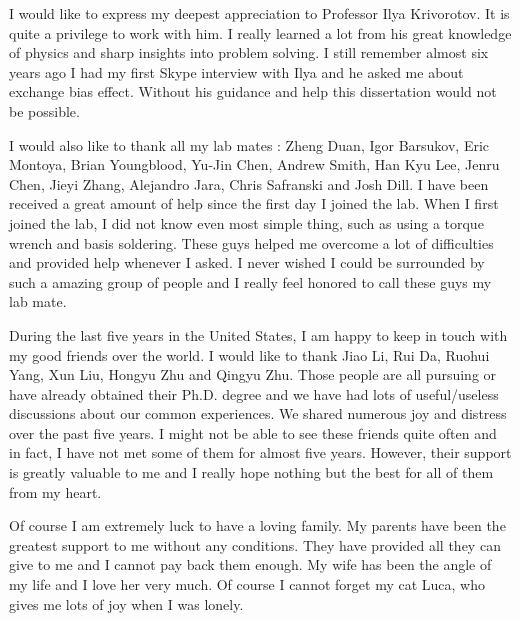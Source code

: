 \acknowledgments
{
  I would like to express my deepest appreciation to Professor Ilya Krivorotov. It is quite a privilege to work with him. I really learned a lot from his great knowledge of physics and sharp insights into problem solving. I still remember almost six years ago I had my first Skype interview with Ilya and he asked me about exchange bias effect. Without his guidance and help this dissertation would not be possible.
  
  I would also like to thank all my lab mates : Zheng Duan, Igor Barsukov, Eric Montoya, Brian Youngblood, Yu-Jin Chen, Andrew  Smith,  Han Kyu Lee, Jenru Chen, Jieyi Zhang,  Alejandro Jara, Chris Safranski and Josh Dill. I have been received a great amount of help since the first day I joined the lab. When I first joined the lab, I did not know even most simple thing, such as using a torque wrench and basis soldering. These guys helped me overcome a lot of difficulties and provided help whenever I asked. I never wished I could be surrounded by such a amazing group of people and I really feel honored to call these guys my lab mate.
  
  During the last five years in the United States, I am happy to keep in touch with my good friends over the world. I would like to thank Jiao Li, Rui Da, Ruohui Yang, Xun Liu, Hongyu Zhu and Qingyu Zhu. Those people are all pursuing or have already obtained their Ph.D. degree and we have had lots of useful/useless discussions about our common experiences. We shared numerous joy and distress over the past five years. I might not be able to see these friends quite often and in fact, I have not met some of them for almost five years. However, their support is greatly valuable to me and I really hope nothing but the best for all of them from my heart.
  
  Of course I am extremely luck to have a loving family. My parents have been the greatest support to me without any conditions. They have provided all they can give to me and I cannot pay back them enough. My wife has been the angle of my life and I love her very much. Of course I cannot forget my cat Luca, who gives me lots of joy when I was lonely.
  
}


\newcommand{\mypubentry}[3]{
  \begin{tabular*}{1\textwidth}{@{\extracolsep{\fill}}p{4.5in}r}
    \textbf{#1} & \textbf{#2} \\ 
    \multicolumn{2}{@{\extracolsep{\fill}}p{.95\textwidth}}{#3}\vspace{6pt} \\
  \end{tabular*}
}
\newcommand{\mysoftentry}[3]{
  \begin{tabular*}{1\textwidth}{@{\extracolsep{\fill}}lr}
    \textbf{#1} & \url{#2} \\
    \multicolumn{2}{@{\extracolsep{\fill}}p{.95\textwidth}}
    {\emph{#3}}\vspace{-6pt} \\
  \end{tabular*}
}

